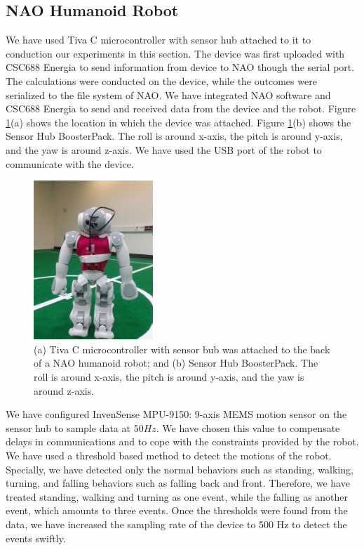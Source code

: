 \documentclass[letterpaper]{article}
\begin{document}
\subsection{NAO Humanoid Robot}

We have used Tiva C microcontroller with sensor hub attached to it to conduction our experiments in
this section. The device was first uploaded with CSC688 Energia to send information from device to
NAO though the serial port. The calculations were conducted on the device, while the outcomes were
serialized to the file system of NAO. We have integrated NAO software and CSC688 Energia to send and
received data from the device and the robot. Figure \ref{fig:attached_device}(a) shows the location
in which the device was attached. Figure \ref{fig:attached_device}(b) shows the Sensor Hub
BoosterPack. The roll is around x-axis, the pitch is around y-axis, and the yaw is around z-axis. 
We have used the USB port of the robot to communicate with the device.  


\begin{figure}[!ht]
\centering
 \includegraphics[width=0.4\textwidth] {attached_device}
 \caption{(a) Tiva C microcontroller with sensor bub was attached to the back of a NAO humanoid
robot; and (b) Sensor Hub BoosterPack. The roll is around x-axis, the pitch is around y-axis, and
the yaw is around z-axis.}
 \label{fig:attached_device}
\end{figure}

We have configured InvenSense MPU-9150: 9-axis MEMS motion sensor on the sensor hub to sample data
at 50$Hz$. We have chosen this value to compensate delays in communications and to cope with the
constraints provided by the robot. We have used a threshold based method to detect the motions of
the robot. Specially, we have detected only the normal behaviors such as standing, walking, turning,
and falling behaviors such as falling back and front. Therefore, we have treated standing, walking
and turning as one event, while the falling as another event, which amounts to three events. Once
the thresholds were found from the data, we have increased the sampling rate of the device to 500 Hz
to detect the events swiftly.  
\end{document}
